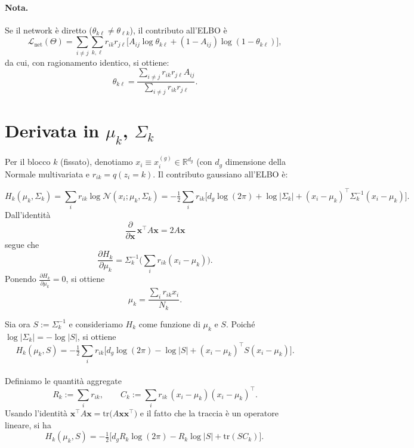 \documentclass[11pt,a4paper]{article}
\begin{document}
\paragraph{Nota.} Se il network è diretto ($\theta_{k\ell}\ne\theta_{\ell k}$), il contributo all'ELBO è
\[
\mathcal{L}_{\text{net}}(\Theta)
= \sum_{i\neq j}\sum_{k,\ell} r_{ik} r_{j\ell}\Big[
A_{ij}\log\theta_{k\ell} + (1-A_{ij})\log(1-\theta_{k\ell})
\Big],
\]
da cui, con ragionamento identico, si ottiene:
\[
\theta_{k\ell}=\frac{\sum_{i\neq j} r_{ik}r_{j\ell}A_{ij}}{\sum_{i\neq j} r_{ik}r_{j\ell}}.
\]


\section{Derivata in $\mu_k$, $\Sigma_k$}
Per il blocco $k$ (fissato), denotiamo $x_i\equiv x_i^{(g)}\in\mathbb{R}^{d_g}$ (con  $d_g$ dimensione della Normale multivariata e $r_{ik}=q(z_i{=}k)$. Il contributo gaussiano all'ELBO è:

\[
H_k(\mu_k,\Sigma_k)
= \sum_i r_{ik}\log \mathcal{N}(x_i;\mu_k,\Sigma_k)
= -\tfrac12\sum_i r_{ik}\Big[d_g\log(2\pi) + \log|\Sigma_k| + (x_i-\mu_k)^\top \Sigma_k^{-1} (x_i-\mu_k)\Big].
\]
Dall'identità 
\[
\frac{\partial}{\partial \mathbf{x}}\,\mathbf{x}^\top A \mathbf{x}= 2 A \mathbf{x}
\]
segue che
\[
\frac{\partial H_k}{\partial \mu_k}
=\Sigma_k^{-1}\Big(\sum_i r_{ik}(x_i-\mu_k)\Big).
\]
Ponendo $\frac{\partial H_k}{\partial \mu_k} = 0$, si ottiene
\[
\mu_k=\frac{\sum_i r_{ik}x_i}{N_k}.
\]


\noindent Sia ora \(S:=\Sigma_k^{-1}\) e consideriamo $H_k$ come funzione di $\mu_k$ e $S$. Poiché \(\log|\Sigma_k| = -\log|S|\), si ottiene
\[
H_k(\mu_k,S)
= -\tfrac12\sum_i r_{ik}\Big[d_g\log(2\pi) - \log|S| + (x_i-\mu_k)^\top S (x_i-\mu_k)\Big].
\]\\
Definiamo le quantità aggregate
\[
R_k := \sum_i r_{ik}, 
\qquad
C_k := \sum_i r_{ik}\,(x_i-\mu_k)(x_i-\mu_k)^\top.
\]
Usando l'identità $\mathbf{x}^\top A \mathbf{x} = \mathrm{tr}\big(A \mathbf{x} \mathbf{x}^\top\big)$ e il fatto che la traccia è un operatore lineare, si ha
\[
H_k(\mu_k,S) = -\tfrac12\Big[d_g R_k\log(2\pi) - R_k\log|S| + \mathrm{tr}(S C_k)\Big].\,
\]
\end{document}
